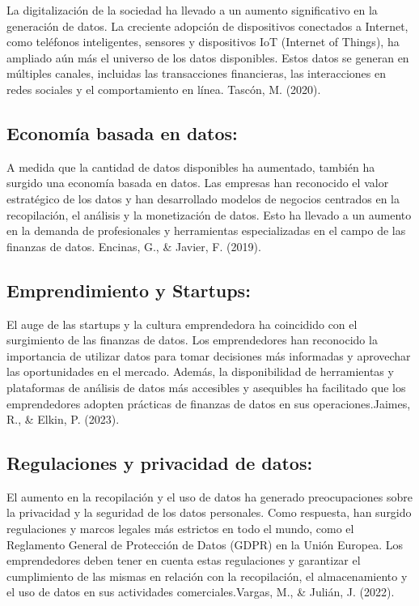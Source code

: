 \documentclass[
  letterpaper,
  DIV=11,
  numbers=noendperiod]{scrreprt}
\begin{document}
La digitalización de la sociedad ha llevado a un aumento significativo
en la generación de datos. La creciente adopción de dispositivos
conectados a Internet, como teléfonos inteligentes, sensores y
dispositivos IoT (Internet of Things), ha ampliado aún más el universo
de los datos disponibles. Estos datos se generan en múltiples canales,
incluidas las transacciones financieras, las interacciones en redes
sociales y el comportamiento en línea. Tascón, M. (2020).

\hypertarget{economuxeda-basada-en-datos}{%
\subsection{Economía basada en
datos:}\label{economuxeda-basada-en-datos}}

A medida que la cantidad de datos disponibles ha aumentado, también ha
surgido una economía basada en datos. Las empresas han reconocido el
valor estratégico de los datos y han desarrollado modelos de negocios
centrados en la recopilación, el análisis y la monetización de datos.
Esto ha llevado a un aumento en la demanda de profesionales y
herramientas especializadas en el campo de las finanzas de datos.
Encinas, G., \& Javier, F. (2019).

\hypertarget{emprendimiento-y-startups}{%
\subsection{Emprendimiento y
Startups:}\label{emprendimiento-y-startups}}

El auge de las startups y la cultura emprendedora ha coincidido con el
surgimiento de las finanzas de datos. Los emprendedores han reconocido
la importancia de utilizar datos para tomar decisiones más informadas y
aprovechar las oportunidades en el mercado. Además, la disponibilidad de
herramientas y plataformas de análisis de datos más accesibles y
asequibles ha facilitado que los emprendedores adopten prácticas de
finanzas de datos en sus operaciones.Jaimes, R., \& Elkin, P. (2023).

\hypertarget{regulaciones-y-privacidad-de-datos}{%
\subsection{Regulaciones y privacidad de
datos:}\label{regulaciones-y-privacidad-de-datos}}

El aumento en la recopilación y el uso de datos ha generado
preocupaciones sobre la privacidad y la seguridad de los datos
personales. Como respuesta, han surgido regulaciones y marcos legales
más estrictos en todo el mundo, como el Reglamento General de Protección
de Datos (GDPR) en la Unión Europea. Los emprendedores deben tener en
cuenta estas regulaciones y garantizar el cumplimiento de las mismas en
relación con la recopilación, el almacenamiento y el uso de datos en sus
actividades comerciales.Vargas, M., \& Julián, J. (2022).
\end{document}
